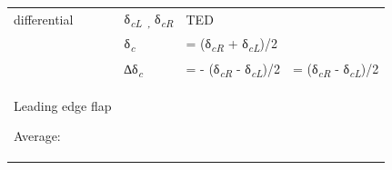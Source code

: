\documentclass[
]{book}
\begin{document}
\begin{longtable}[]{@{}llll@{}}
\begin{minipage}[t]{0.35\columnwidth}
differential\strut
\end{minipage} & \begin{minipage}[t]{0.13\columnwidth}\raggedright
δ\emph{\textsubscript{cL~,}} δ\emph{\textsubscript{cR}}\strut
\end{minipage} & \begin{minipage}[t]{0.26\columnwidth}\raggedright
TED\strut
\end{minipage} & \begin{minipage}[t]{0.14\columnwidth}\raggedright
\strut
\end{minipage}\tabularnewline
\begin{minipage}[t]{0.35\columnwidth}\raggedright
\strut
\end{minipage} & \begin{minipage}[t]{0.13\columnwidth}\raggedright
δ\emph{\textsubscript{c}}\strut
\end{minipage} & \begin{minipage}[t]{0.26\columnwidth}\raggedright
= (δ\emph{\textsubscript{cR}} + δ\emph{\textsubscript{cL}})/2\strut
\end{minipage} & \begin{minipage}[t]{0.14\columnwidth}\raggedright
\strut
\end{minipage}\tabularnewline
\begin{minipage}[t]{0.35\columnwidth}\raggedright
\strut
\end{minipage} & \begin{minipage}[t]{0.13\columnwidth}\raggedright
∆δ\emph{\textsubscript{c}}\strut
\end{minipage} & \begin{minipage}[t]{0.26\columnwidth}\raggedright
= - (δ\emph{\textsubscript{cR}} - δ\emph{\textsubscript{cL}})/2\strut
\end{minipage} & \begin{minipage}[t]{0.14\columnwidth}\raggedright
= (δ\emph{\textsubscript{cR}} - δ\emph{\textsubscript{cL}})/2\strut
\end{minipage}\tabularnewline
\begin{minipage}[t]{0.35\columnwidth}\raggedright
Leading edge flap

Average:


\end{minipage}
\end{longtable}
\end{document}
